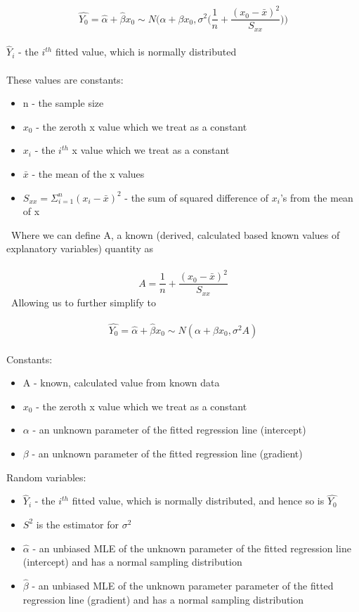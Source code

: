 \documentclass[11pt]{article}   	%
\begin{document}
\
\[ \hat{Y_0} = \hat{\alpha} + \hat{\beta}x_0 \sim N \Bigg( \alpha + \beta x_0, \sigma^2 \bigg( \frac{1}{n} + \frac{(x_0 - \bar{x})^2}{S_{xx}} \bigg) \Bigg) \] \
\\
$ \hat{Y}_i $ - the $ i^{th} $ fitted value, which is normally distributed \\
\\
These values are constants:
\begin{itemize}
  \item n - the sample size 
  \item $ x_0 $ - the zeroth x value which we treat as a constant
  \item $ x_i $ - the $ i^{th} $ x value which we treat as a constant 
  \item $ \bar{x} $ - the mean of the x values 
  \item $ S_{xx} = \Sigma_{i=1}^{n} (x_i - \bar{x} )^2 $ - the sum of squared difference of $x_i$'s from the mean of x 
\end{itemize}
\
Where we can define A, a known (derived, calculated based known values of explanatory variables) quantity as \\
\
\[ A = \frac{1}{n} + \frac{ (x_0 - \bar{x})^2 } { S_{xx} } \]
\
Allowing us to further simplify to \\
\
\[ \hat{Y_0} = \hat{\alpha} + \hat{\beta}x_0 \sim N( \alpha + \beta x_0, \sigma^2  A ) \] \
\\
Constants:
\begin{itemize}
  \item A - known, calculated value from known data
  \item $ x_0 $ - the zeroth x value which we treat as a constant
  \item $ \alpha $ - an unknown parameter of the fitted regression line (intercept)
  \item $ \beta $ - an unknown parameter of the fitted regression line (gradient)
\end{itemize} 
Random variables:
\begin{itemize}
  \item $ \hat{Y}_i $ - the $ i^{th} $ fitted value, which is normally distributed, and hence so is $ \hat{Y_0} $
  \item $ S^2 $ is the estimator for $ \sigma^2 $ 
  \item $ \hat{\alpha} $ - an unbiased MLE of the unknown parameter of the fitted regression line (intercept) and has a normal sampling distribution 
  \item $ \hat{\beta} $ - an unbiased MLE of the unknown parameter parameter of the fitted regression line (gradient) and has a normal sampling distribution 
\end{itemize}
 
\end{document}
